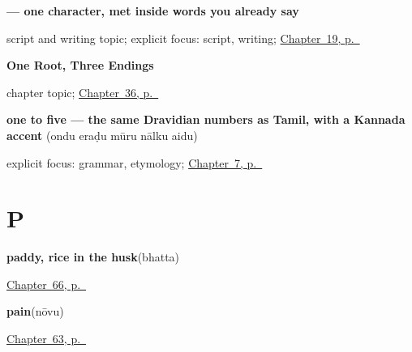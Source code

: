 \noindent\begin{minipage}[t]{\linewidth}
\raggedright
\textbf{ — one character, met inside words you already say}\par
\footnotesize script and writing topic; explicit focus: script, writing; \hyperref[ch:ka-asking-age]{Chapter~19, p.~\pageref*{ch:ka-asking-age}}
\end{minipage}\par\smallskip

\noindent\begin{minipage}[t]{\linewidth}
\raggedright
\textbf{One Root, Three Endings}\par
\footnotesize chapter topic; \hyperref[ch:ka-child-son-daughter]{Chapter~36, p.~\pageref*{ch:ka-child-son-daughter}}
\end{minipage}\par\smallskip

\noindent\begin{minipage}[t]{\linewidth}
\raggedright
\textbf{one to five — the same Dravidian numbers as Tamil, with a Kannada accent}\enspace\emph{    }\enspace(ondu eraḍu mūru nālku aidu)\par
\footnotesize explicit focus: grammar, etymology; \hyperref[ch:ka-numbers-one-to-ten]{Chapter~7, p.~\pageref*{ch:ka-numbers-one-to-ten}}
\end{minipage}\par\smallskip

\section*{P}

\noindent\begin{minipage}[t]{\linewidth}
\raggedright
\textbf{paddy, rice in the husk}\enspace\emph{}\enspace(bhatta)\par
\footnotesize \hyperref[ch:ka-field]{Chapter~66, p.~\pageref*{ch:ka-field}}
\end{minipage}\par\smallskip

\noindent\begin{minipage}[t]{\linewidth}
\raggedright
\textbf{pain}\enspace\emph{}\enspace(nōvu)\par
\footnotesize \hyperref[ch:ka-health]{Chapter~63, p.~\pageref*{ch:ka-health}}
\end{minipage}\par\smallskip

